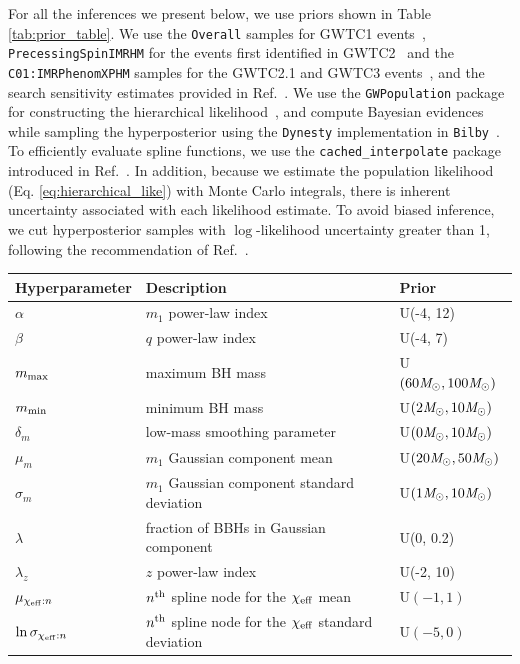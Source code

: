 \begin{refsection}
For all the inferences we present below, we use priors shown in Table \ref{tab:prior_table}. We use the {\tt Overall} samples for GWTC1 events~\cite{gwtc1_pe}, {\tt PrecessingSpinIMRHM} for the events first identified in GWTC2~\cite{gwtc2_pe} and the {\tt C01:IMRPhenomXPHM} samples for the GWTC2.1 and GWTC3 events~\cite{ligo_scientific_collaboration_and_virgo_2022_6513631, ligo_scientific_collaboration_and_virgo_2023_8177023}, and the search sensitivity estimates provided in Ref.~\cite{ligo_scientific_collaboration_and_virgo_2023_7890398}. We use the {\tt GWPopulation} package for constructing the hierarchical likelihood~\cite{Talbot:2019}, and compute Bayesian evidences while sampling the hyperposterior using the {\tt Dynesty} implementation in {\tt Bilby}~\cite{Speagle_2020,Ashton:2018jfp}. To efficiently evaluate spline functions, we use the {\tt cached\_interpolate} package introduced in Ref.~\cite{Golomb:2022bon}. In addition, because we estimate the population likelihood (Eq. \ref{eq:hierarchical_like}) with Monte Carlo integrals, there is inherent uncertainty associated with each likelihood estimate. To avoid biased inference, we cut hyperposterior samples with $\log$-likelihood uncertainty greater than 1, following the recommendation of Ref.~\cite{Talbot:2023pex}.

\renewcommand{\arraystretch}{1.3}
\renewcommand{\tabcolsep}{0.3cm}
\begin{table}
    \centering
    \begin{tabular}{|l||ll|}
       \hline Hyperparameter & Description & Prior \\
       \hline $\alpha$ & $m_1$ power-law index & U(-4, 12) \\
       $\beta$ & $q$ power-law index & U(-4, 7) \\
       $m_{\rm max}$ & maximum BH mass & U$(60\mathit{M_\odot}, 100\mathit{M_\odot})$ \\
       $m_{\rm min}$ & minimum BH mass & U$(2\mathit{M_\odot}, 10\mathit{M_\odot})$ \\
       $\delta_m$ & low-mass smoothing parameter & U$(0\mathit{M_\odot}, 10\mathit{M_\odot})$ \\
       $\mu_{m}$ & $m_1$ Gaussian component mean & U$(20\mathit{M_\odot}, 50\mathit{M_\odot})$ \\
       $\sigma_{m}$ & $m_1$ Gaussian component standard deviation  & U$(1\mathit{M_\odot}, 10\mathit{M_\odot})$ \\
       $\lambda$ & fraction of BBHs in Gaussian component & U(0, 0.2) \\
       $\lambda_z$ & $z$ power-law index & U(-2, 10) \\
       \hline $\mu_{\chi_{\rm eff}:n}$ & $n^{\rm th}$ spline node for the $\chi_{\rm eff}$ mean & U$(-1,1)$ \\
       $\ln\sigma_{\chi_{\rm eff}:n}$ & $n^{\rm th}$ spline node for the $\chi_{\rm eff}$ standard deviation & U$(-5,0)$
       \\ \hline
       

\end{tabular}
\end{table}
\end{refsection}
